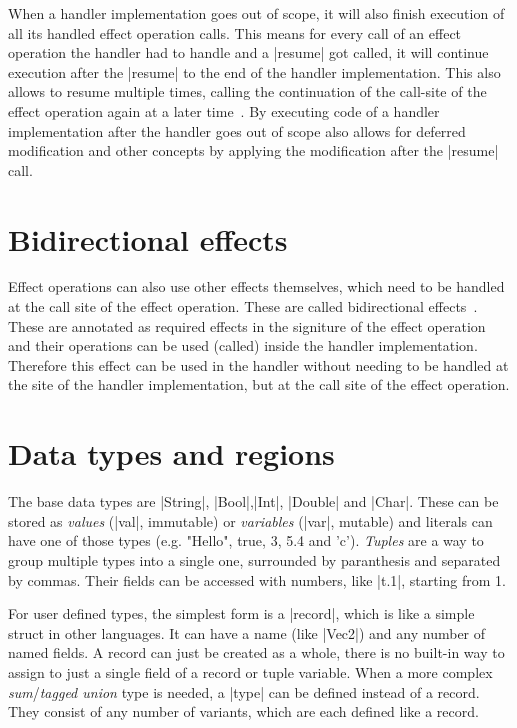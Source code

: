 When a handler implementation goes out of scope, it will also finish execution of all its handled effect operation calls. This means for every call of an effect operation the handler had to handle and a |resume| got called, it will continue execution after the |resume| to the end of the handler implementation. This also allows to resume multiple times, calling the continuation of the call-site of the effect operation again at a later time~\cite{brachthauser2020effects}. By executing code of a handler implementation after the handler goes out of scope also allows for deferred modification and other concepts by applying the modification after the |resume| call.

\section{Bidirectional effects}

Effect operations can also use other effects themselves, which need to be handled at the call site of the effect operation. These are called bidirectional effects~\cite{zhang2020bidirectional}. These are annotated as required effects in the signiture of the effect operation and their operations can be used (called) inside the handler implementation. Therefore this effect can be used in the handler without needing to be handled at the site of the handler implementation, but at the call site of the effect operation.

\section{Data types and regions}

The base data types are |String|, |Bool|,|Int|, |Double| and |Char|. These can be stored as \textit{values} (|val|, immutable) or \textit{variables} (|var|, mutable) and literals can have one of those types (e.g. "Hello", true, 3, 5.4 and 'c'). \textit{Tuples} are a way to group multiple types into a single one, surrounded by paranthesis and separated by commas. Their fields can be accessed with numbers, like |t.1|, starting from 1.

For user defined types, the simplest form is a |record|, which is like a simple struct in other languages. It can have a name (like |Vec2|) and any number of named fields. A record can just be created as a whole, there is no built-in way to assign to just a single field of a record or tuple variable. When a more complex \textit{sum}/\textit{tagged union} type is needed, a |type| can be defined instead of a record. They consist of any number of variants, which are each defined like a record.

